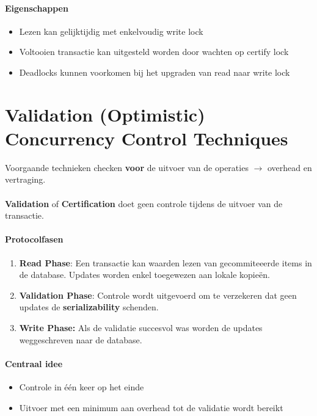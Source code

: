 \paragraph{Eigenschappen}
\begin{itemize}
	\item Lezen kan gelijktijdig met enkelvoudig write lock
	\item Voltooien transactie kan uitgesteld worden door wachten op certify lock
	\item Deadlocks kunnen voorkomen bij het upgraden van read naar write lock
\end{itemize}



\section{Validation (Optimistic) Concurrency Control Techniques}%
Voorgaande technieken checken \textbf{voor} de uitvoer van de operaties $\rightarrow$ overhead en vertraging.
\\\\
\textbf{Validation} of \textbf{Certification} doet geen controle  tijdens de uitvoer van de transactie.

\paragraph{Protocolfasen}
\begin{enumerate}
	\item \textbf{Read Phase}: Een transactie kan waarden lezen van gecommiteeerde items in de database. Updates worden enkel toegewezen aan lokale kopie\"en.
	\item \textbf{Validation Phase}: Controle wordt uitgevoerd om te verzekeren dat geen updates de \textbf{serializability} schenden.
	\item \textbf{Write Phase:} Als de validatie succesvol was worden de updates weggeschreven naar de database.
\end{enumerate}

\paragraph{Centraal idee}
\begin{itemize}
	\item Controle in \'e\'en keer op het einde
	\item Uitvoer met een minimum aan overhead tot de validatie wordt bereikt	
\end{itemize}

